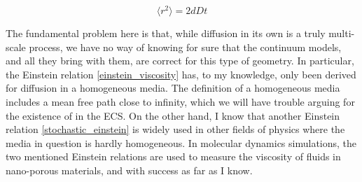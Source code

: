 \begin{equation}\label{stochastic_einstein}
\langle r^2\rangle = 2dDt 
\end{equation}

The fundamental problem here is that, while diffusion in its own is a truly multi-scale process, we have no way of knowing for sure that the continuum models, and all they bring with them, are correct for this type of geometry. 
In particular, the Einstein relation \ref{einstein_viscosity} has, to my knowledge, only been derived for diffusion in a homogeneous media. 
The definition of a homogeneous media includes a mean free path close to infinity, which we will have trouble arguing for the existence of in the ECS. 
On the other hand, I know that another Einstein relation \ref{stochastic_einstein} is widely used  in other fields of physics where the media in question is hardly homogeneous. 
In molecular dynamics simulations, the two mentioned Einstein relations are used to measure the viscosity of fluids in nano-porous materials, and with success as far as I know.

